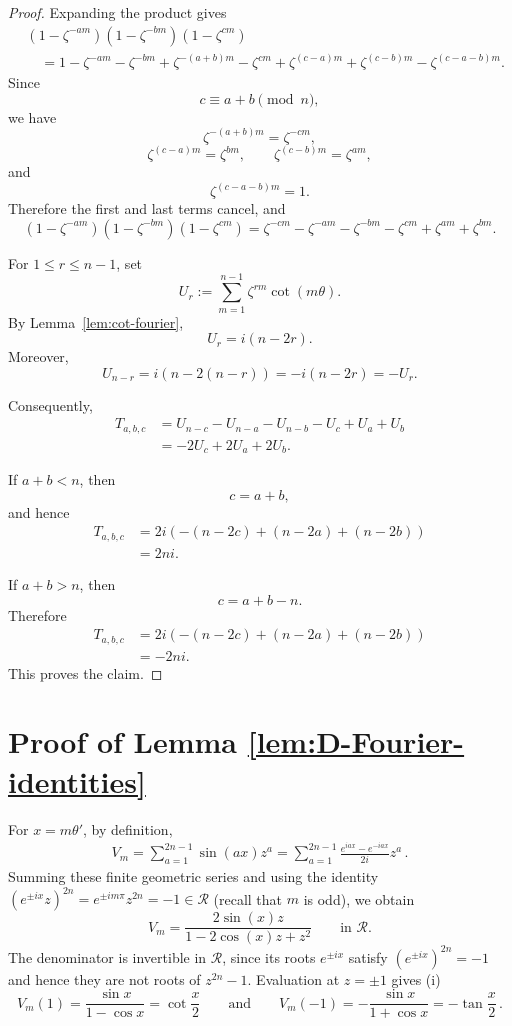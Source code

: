 \documentclass[a4paper,reqno]{amsart}
\theoremstyle{plain} %
\theoremstyle{definition} %
\theoremstyle{remark} %
\newcommand{\cR}{{\mathcal R}}
\newcommand{\1}{\mathds{1}}   %
\begin{document}
\begin{proof}
Expanding the product gives
\begin{align*}
&(1-\zeta^{-am})(1-\zeta^{-bm})(1-\zeta^{cm})
\\
&\quad=
1-\zeta^{-am}-\zeta^{-bm}
+\zeta^{-(a+b)m}
-\zeta^{cm}
+\zeta^{(c-a)m}
+\zeta^{(c-b)m}
-\zeta^{(c-a-b)m}.
\end{align*}
Since
\[
c\equiv a+b\pmod n,
\]
we have
\[
\zeta^{-(a+b)m}=\zeta^{-cm},
\]
\[
\zeta^{(c-a)m}=\zeta^{bm},
\qquad
\zeta^{(c-b)m}=\zeta^{am},
\]
and
\[
\zeta^{(c-a-b)m}=1.
\]
Therefore the first and last terms cancel, and
\[
(1-\zeta^{-am})(1-\zeta^{-bm})(1-\zeta^{cm})
=
\zeta^{-cm}
-\zeta^{-am}
-\zeta^{-bm}
-\zeta^{cm}
+\zeta^{am}
+\zeta^{bm}.
\]

For \(1\leq r\leq n-1\), set
\[
U_r
:=
\sum_{m=1}^{n-1}
\zeta^{rm}\cot(m\theta).
\]
By Lemma~\ref{lem:cot-fourier},
\[
U_r=i(n-2r).
\]
Moreover,
\[
U_{n-r}
=
i(n-2(n-r))
=
-i(n-2r)
=
-U_r.
\]

Consequently,
\begin{align*}
T_{a,b,c}
&=
U_{n-c}
-U_{n-a}
-U_{n-b}
-U_c
+U_a
+U_b\\
&=
-2U_c+2U_a+2U_b.
\end{align*}

If \(a+b<n\), then
\[
c=a+b,
\]
and hence
\begin{align*}
T_{a,b,c}
&=
2i
\left(
-(n-2c)+(n-2a)+(n-2b)
\right)\\
&=
2ni.
\end{align*}

If \(a+b>n\), then
\[
c=a+b-n.
\]
Therefore
\begin{align*}
T_{a,b,c}
&=
2i
\left(
-(n-2c)+(n-2a)+(n-2b)
\right)\\
&=
-2ni.
\end{align*}
This proves the claim.
\end{proof}

\section{Proof of Lemma \ref{lem:D-Fourier-identities}}\label{Appendix B}

For $x=m\theta'$, by definition, 
\begin{align*}
V_m = \sum_{a=1}^{2n-1} \sin(ax)z^a = \sum_{a=1}^{2n-1} \frac{e^{iax} - e^{-iax}}{2i} z^a \, .
\end{align*}
Summing these finite geometric series and using the identity 
$(e^{\pm ix}z)^{2n} =e^{\pm im \pi}z^{2n} =-1 \in \cR$ (recall that $m$ is odd), we obtain
\begin{equation}\label{eq:D-Vm-rational}
V_m
=
\frac{2\sin(x)z}
     {1-2\cos(x)z+z^2}
\qquad
\text{in }\mathcal R.
\end{equation}
The denominator is invertible in \(\mathcal R\), since its roots
\(e^{\pm ix}\) satisfy $(e^{\pm ix})^{2n} =-1$ and hence they are not roots of $z^{2n} -1$.
Evaluation at \(z=\pm1\) gives (i)
\[
V_m(1)= \frac{\sin x}{1-\cos x} = \cot \frac{x}{2} \qquad \mbox{and} \qquad V_m(-1) = -\frac{\sin x}{1+\cos x} = -\tan \frac{x}{2} \, .
\]
\end{document}

